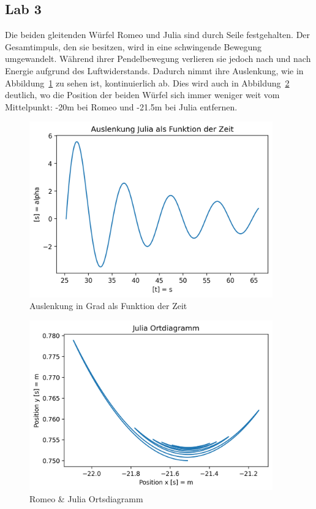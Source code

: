 \documentclass[../main.tex]{subfiles}
\begin{document}
    \subsection{Lab 3}

    Die beiden gleitenden Würfel Romeo und Julia sind durch Seile festgehalten.
    Der Gesamtimpuls, den sie besitzen, wird in eine schwingende Bewegung umgewandelt.
    Während ihrer Pendelbewegung verlieren sie jedoch nach und nach Energie aufgrund des
    Luftwiderstands. Dadurch nimmt ihre Auslenkung, wie in Abbildung~\ref{fig:Auslenkung}
    zu sehen ist, kontinuierlich ab. Dies wird auch in Abbildung~\ref{fig:RomeoJuliaOrtsdiagramm}
    deutlich, wo die Position der beiden Würfel sich immer weniger weit vom Mittelpunkt: -20m bei
    Romeo und -21.5m bei Julia entfernen.



    \begin{figure}[H]
        \begin{center}
            \centerline{\includegraphics[width=105mm]{./images/ropeJulia/AuslenkungDeg}}
            \caption{Auslenkung in Grad als Funktion der Zeit}
            \label{fig:Auslenkung}
        \end{center}
    \end{figure}

    \begin{figure}[H]
        \begin{center}
            \centerline{\includegraphics[width=105mm]{./images/ropeJulia/Ortdiagramm}}
            \caption{Romeo \& Julia Ortsdiagramm}
            \label{fig:RomeoJuliaOrtsdiagramm}
        \end{center}
    \end{figure}
\end{document}

